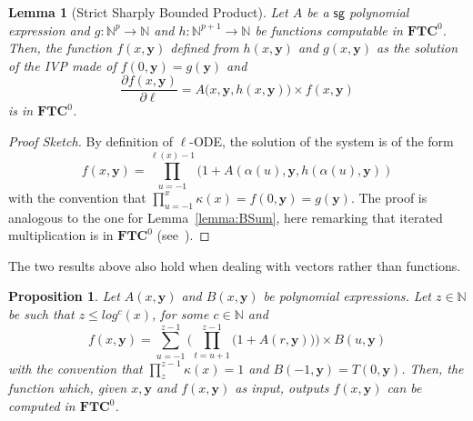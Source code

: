 \documentclass[11pt, oneside]{article}
\newcommand{\fun}[1]{\mathsf{#1}}
\newcommand{\sB}{B}
\newcommand{\sA}{A}
\newcommand{\Nat}{\mathbb{N}}
\newcommand{\TC}{\mathbf{FTC}}
\newcommand{\tu}[1]{\mathbf{#1}}
\newtheorem{prop}{Proposition}
\newtheorem{lemma}{Lemma}
\theoremstyle{definition}
\newtheorem{defn}{Definition}
\newcommand{\pODE}{\ell\text{-pODE}}
\begin{document}
\begin{toappendix}
\begin{lemma}[Strict Sharply Bounded Product]\label{lemma:BProd}
    Let $\sA$ be a $\fun{sg}$ polynomial expression and $g:\Nat^{p}\to \Nat$ and $h:\Nat^{p+1}\to \Nat$ be functions computable in $\TC^0$.
    Then, the function $f(x, \tu y)$ defined from $h(x, \tu y)$ and $g(x, \tu y)$ as the solution of the IVP made of $f(0, \tu y)=g(\tu y)$ and
    $$
        \frac{\partial f(x, \tu y)}{\partial \ell} = \sA\big(x, \tu y, h(x, \tu y)\big)\times f(x, \tu y)
    $$
    is in $\TC^0$.
\end{lemma}
\begin{proof}[Proof Sketch]
    By definition of $\ell$-ODE, the solution of the system is of the form 
    $$
    f(x, \tu y) =\prod^{\ell(x)-1}_{u=-1} (1 + \sA(\alpha(u), \tu y, h(\alpha(u), \tu y))
    $$
    with the convention that $\prod^{x}_{u=-1}\kappa(x)=f(0, \tu y)=g(\tu y)$.
    The proof is analogous to the one for Lemma~\ref{lemma:BSum}, here remarking that iterated multiplication is in $\TC^0$ (see~\cite{HAB}).
\end{proof}



\noindent 
The two results above also hold when dealing with vectors rather than functions.

\begin{prop}\label{prop:aux}
    Let $\sA(x, \tu y)$ and $\sB(x, \tu y)$ be polynomial expressions.
    Let $z\in \Nat$ be such that $z\leq log^c(x)$, for some $c\in \Nat$ and 
    $$
        f(x, \tu y) = \sum^{z-1}_{u=-1} \Bigg(\prod^{z-1}_{t=u+1} \bigg(1+\sA(r, \tu y)\bigg)\Bigg) \times \sB (u, \tu y)
    $$
    with the convention that $\prod^{z-1}_z \kappa(x)=1$ and $\sB(-1, \tu y)=T(0, \tu y)$.
    Then, the function which, given $x, \tu y$ and $f(x, \tu y)$ as input, outputs $f(x, \tu y)$ can be computed in $\TC^0$.
\end{prop}


%



\end{toappendix}
\end{document}
